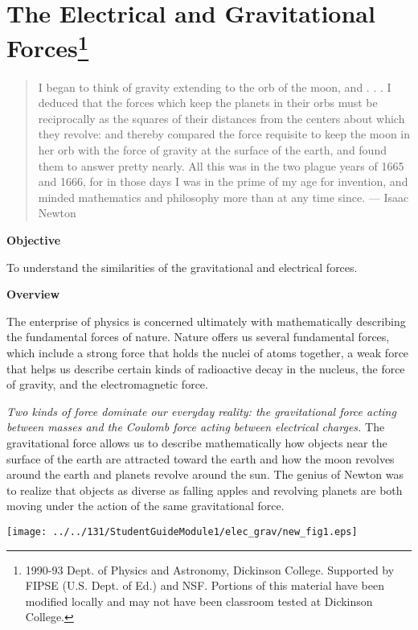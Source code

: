 
\section{The Electrical and Gravitational Forces\footnote{
1990-93 Dept. of Physics and Astronomy, Dickinson College. Supported by FIPSE
(U.S. Dept. of Ed.) and NSF. Portions of this material have been modified locally
and may not have been classroom tested at Dickinson College.
} }

\makelabheader %

\begin{quote}
I began to think of gravity extending to the orb of the moon, and . . . I deduced
that the forces which keep the planets in their orbs must be reciprocally as
the squares of their distances from the centers about which they revolve: and
thereby compared the force requisite to keep the moon in her orb with the force
of gravity at the surface of the earth, and found them to answer pretty nearly.
All this was in the two plague years of 1665 and 1666, for in those days I was
in the prime of my age for invention, and minded mathematics and philosophy
more than at any time since. --- Isaac Newton 
\end{quote}
\textbf{Objective }

To understand the similarities of the gravitational and electrical forces. 

\textbf{Overview }

The enterprise of physics is concerned ultimately with mathematically describing
the fundamental forces of nature. Nature offers us several fundamental forces,
which include a strong force that holds the nuclei of atoms together, a weak
force that helps us describe certain kinds of radioactive decay in the nucleus,
the force of gravity, and the electromagnetic force. 

\textit{Two kinds of force dominate our everyday reality: 
the gravitational force
acting between masses and the Coulomb force acting between electrical charges.}
The gravitational force allows us to describe mathematically how objects near
the surface of the earth are attracted toward the earth and how the moon revolves
around the earth and planets revolve around the sun. The genius of Newton was
to realize that objects as diverse as falling apples and revolving planets are
both moving under the action of the same gravitational force. 

\answerspace{0.3cm}
\begin{center}
\texttt{[image: ../../131/StudentGuideModule1/elec\_grav/new\_fig1.eps]} 
\end{center}
\answerspace{0.3cm}


